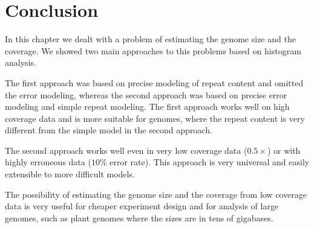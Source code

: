\section{Conclusion}

In this chapter we dealt with a problem of estimating the genome size and the coverage. We showed two main approaches to this problems based on \kmer histogram analysis.

The first approach was based on precise modeling of repeat content and omitted the error modeling, whereas the second approach was based on precise error modeling and simple repeat modeling.
The first approach works well on high coverage data and is more suitable for genomes, where the repeat content is very different from the simple model in the second approach.

The second approach works well even in very low coverage data ($0.5\times$) or with highly erroneous data ($10\%$ error rate). This approach is very universal and easily extensible to more difficult models.

The possibility of estimating the genome size and the coverage from low coverage data is very useful for cheaper experiment design and for analysis of large genomes, such as plant genomes where the sizes are in tens of gigabases.
